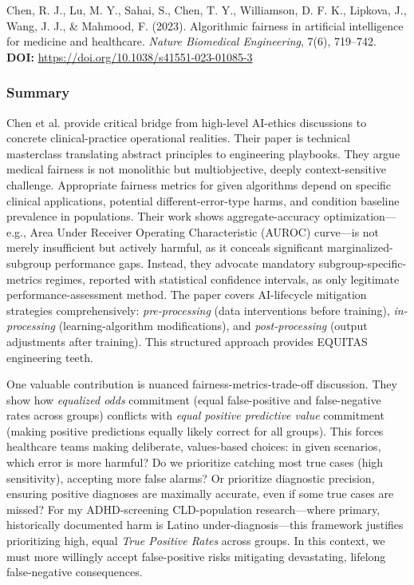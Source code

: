 \documentclass[11pt,twoside]{article}
\begin{document}
\vspace{-0.3cm}

Chen, R. J., Lu, M. Y., Sahai, S., Chen, T. Y., Williamson, D. F. K., Lipkova, J., Wang, J. J., \& Mahmood, F. (2023). Algorithmic fairness in artificial intelligence for medicine and healthcare. \textit{Nature Biomedical Engineering}, 7(6), 719--742. \\

\textbf{DOI:} \href{https://doi.org/10.1038/s41551-023-01085-3}{https://doi.org/10.1038/s41551-023-01085-3}

\vspace{-0.3cm}

\subsubsection*{Summary}

\vspace{-0.3cm}

Chen et al. provide critical bridge from high-level AI-ethics discussions to concrete clinical-practice operational realities. Their paper is technical masterclass translating abstract principles to engineering playbooks. They argue medical fairness is not monolithic but multiobjective, deeply context-sensitive challenge. Appropriate fairness metrics for given algorithms depend on specific clinical applications, potential different-error-type harms, and condition baseline prevalence in populations. Their work shows aggregate-accuracy optimization---e.g., Area Under Receiver Operating Characteristic (AUROC) curve---is not merely insufficient but actively harmful, as it conceals significant marginalized-subgroup performance gaps. Instead, they advocate mandatory subgroup-specific-metrics regimes, reported with statistical confidence intervals, as only legitimate performance-assessment method. The paper covers AI-lifecycle mitigation strategies comprehensively: \textit{pre-processing} (data interventions before training), \textit{in-processing} (learning-algorithm modifications), and \textit{post-processing} (output adjustments after training). This structured approach provides EQUITAS engineering teeth.

One valuable contribution is nuanced fairness-metrics-trade-off discussion. They show how \textit{equalized odds} commitment (equal false-positive and false-negative rates across groups) conflicts with \textit{equal positive predictive value} commitment (making positive predictions equally likely correct for all groups). This forces healthcare teams making deliberate, values-based choices: in given scenarios, which error is more harmful? Do we prioritize catching most true cases (high sensitivity), accepting more false alarms? Or prioritize diagnostic precision, ensuring positive diagnoses are maximally accurate, even if some true cases are missed? For my ADHD-screening CLD-population research---where primary, historically documented harm is Latino under-diagnosis---this framework justifies prioritizing high, equal \textit{True Positive Rates} across groups. In this context, we must more willingly accept false-positive risks mitigating devastating, lifelong false-negative consequences.
\end{document}
